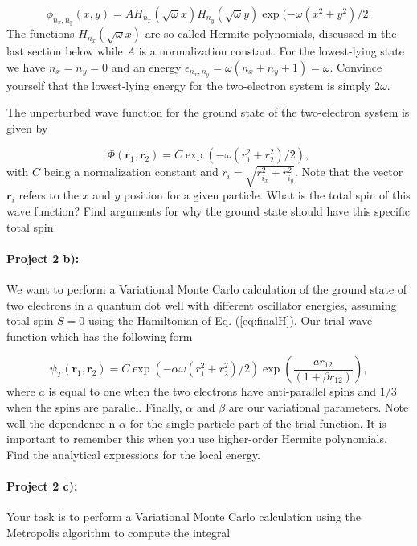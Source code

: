 \documentclass[%
oneside,                 %
final,                   %
10pt]{article}
\begin{document}
\begin{equation*}
\phi_{n_x,n_y}(x,y) = A H_{n_x}(\sqrt{\omega}x)H_{n_y}(\sqrt{\omega}y)\exp{(-\omega(x^2+y^2)/2}.
\end{equation*}
The functions $H_{n_x}(\sqrt{\omega}x)$ are so-called Hermite polynomials, discussed in the last section below  while $A$ is a normalization constant. 
For the lowest-lying state we have $n_x=n_y=0$ and an energy $\epsilon_{n_x,n_y}=\omega(n_x+n_y+1) = \omega$.
Convince yourself that the lowest-lying energy for the two-electron system  is simply $2\omega$.

The unperturbed wave function for the ground state of the two-electron system is given by

\begin{equation*}
\Phi(\bm{r}_1,\bm{r}_2) = C\exp{\left(-\omega(r_1^2+r_2^2)/2\right)},
\end{equation*}
with $C$ being a normalization constant and $r_i = \sqrt{r_{i_x}^2+r_{i_y}^2}$. Note that the vector $\bm{r}_i$ 
refers to the $x$ and $y$ position for a given particle.
What is the total spin of this wave function? Find arguments for why the ground state should have
this specific total spin. 

\paragraph{Project 2 b):}
We want to perform  a Variational Monte Carlo calculation of the ground state of two electrons in a quantum dot well with different oscillator energies, assuming total spin $S=0$ using the Hamiltonian of
Eq. (\ref{eq:finalH}). 
Our trial wave function which has the following form

\begin{equation}
   \psi_{T}(\bm{r}_1,\bm{r}_2) = 
   C\exp{\left(-\alpha\omega(r_1^2+r_2^2)/2\right)}
   \exp{\left(\frac{ar_{12}}{(1+\beta r_{12})}\right)}, 
\label{eq:trial}
\end{equation}
where $a$ is equal to one when the two electrons have anti-parallel spins and $1/3$ when the spins are parallel. Finally, $\alpha$ and $\beta$ are our variational parameters. Note well the dependence n $\alpha$ for the single-particle part of the trial function. It is important to remember this when you use higher-order Hermite polynomials.
Find the analytical expressions for the local energy.


\paragraph{Project 2 c):}
Your task is to perform a Variational Monte Carlo calculation
using the Metropolis algorithm to compute the integral
\end{document}
